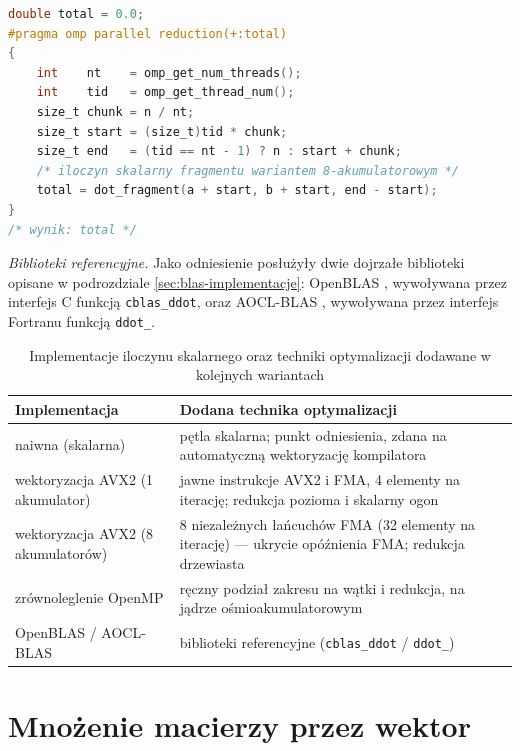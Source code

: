 \documentclass[a4paper,12pt]{book} %
\begin{document}
\begin{lstfloat}[t!]
\begin{lstlisting}[language=C, caption={Iloczyn skalarny --- region równoległy OpenMP: ręczny podział zakresu wektora na rozłączne fragmenty i redukcja wyników cząstkowych}, label={lst:dot-omp}]
double total = 0.0;
#pragma omp parallel reduction(+:total)
{
    int    nt    = omp_get_num_threads();
    int    tid   = omp_get_thread_num();
    size_t chunk = n / nt;
    size_t start = (size_t)tid * chunk;
    size_t end   = (tid == nt - 1) ? n : start + chunk;
    /* iloczyn skalarny fragmentu wariantem 8-akumulatorowym */
    total = dot_fragment(a + start, b + start, end - start);
}
/* wynik: total */
\end{lstlisting}
\end{lstfloat}

\emph{Biblioteki referencyjne.} Jako odniesienie posłużyły dwie dojrzałe biblioteki opisane w podrozdziale \ref{sec:blas-implementacje}: OpenBLAS \cite{zhang2012openblas}, wywoływana przez interfejs C funkcją \texttt{cblas\_ddot}, oraz AOCL-BLAS \cite{amd_aocl_blas}, wywoływana przez interfejs Fortranu funkcją \texttt{ddot\_}. 

\begin{table}[t!]
\centering
\caption{Implementacje iloczynu skalarnego oraz techniki optymalizacji dodawane w kolejnych wariantach}
\label{tab:dot-impl}
\begin{tabular}{p{} p{}}
\hline
Implementacja & Dodana technika optymalizacji \\
\hline
naiwna (skalarna) & pętla skalarna; punkt odniesienia, zdana na automatyczną wektoryzację kompilatora \\
wektoryzacja AVX2 (1 akumulator) & jawne instrukcje AVX2 i FMA, 4 elementy na iterację; redukcja pozioma i skalarny ogon \\
wektoryzacja AVX2 (8 akumulatorów) & 8 niezależnych łańcuchów FMA (32 elementy na iterację) --- ukrycie opóźnienia FMA; redukcja drzewiasta \\
zrównoleglenie OpenMP & ręczny podział zakresu na wątki i redukcja, na jądrze ośmioakumulatorowym \\
OpenBLAS / AOCL-BLAS & biblioteki referencyjne (\texttt{cblas\_ddot} / \texttt{ddot\_}) \\
\hline
\end{tabular}
\end{table}

\section{Mnożenie macierzy przez wektor}
\label{sec:impl-gemv}
\end{document}
